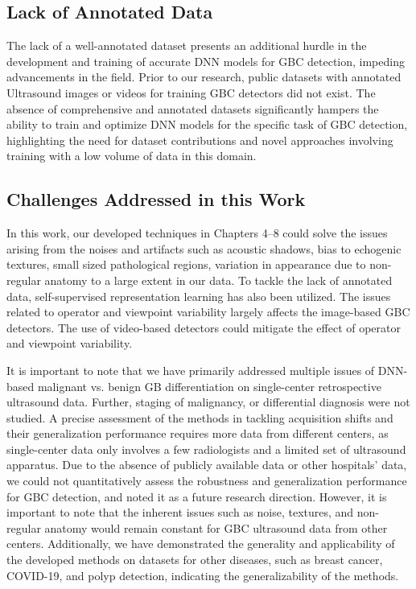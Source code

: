 \subsection{Lack of Annotated Data}
%
The lack of a well-annotated dataset presents an additional hurdle in the development and training of accurate DNN models for GBC detection, impeding advancements in the field. Prior to our research, public datasets with annotated Ultrasound images or videos for training GBC detectors did not exist. The absence of comprehensive and annotated datasets significantly hampers the ability to train and optimize DNN models for the specific task of GBC detection, highlighting the need for dataset contributions and novel approaches involving training with a low volume of data in this domain.

\subsection{Challenges Addressed in this Work}
%
In this work, our developed techniques in Chapters 4--8 could solve the issues arising from the noises and artifacts such as acoustic shadows, bias to echogenic textures, small sized pathological regions, variation in appearance due to non-regular anatomy to a large extent in our data. To tackle the lack of annotated data, self-supervised representation learning has also been utilized. The issues related to operator and viewpoint variability largely affects the image-based GBC detectors. The use of video-based detectors could mitigate the effect of operator and viewpoint variability.

It is important to note that we have primarily addressed multiple issues of DNN-based malignant vs. benign GB  differentiation on single-center retrospective ultrasound data. Further, staging of malignancy, or differential diagnosis were not studied. A precise assessment of the methods in tackling acquisition shifts and their generalization performance requires more data from different centers, as single-center data only involves a few radiologists and a limited set of ultrasound apparatus. Due to the absence of publicly available data or other hospitals' data, we could not quantitatively assess the robustness and generalization performance for GBC detection, and noted it as a future research direction. However, it is important to note that the inherent issues such as noise, textures, and non-regular anatomy would remain constant for GBC ultrasound data from other centers. Additionally, we have demonstrated the generality and applicability of the developed methods on datasets for other diseases, such as breast cancer, COVID-19, and polyp detection, indicating the generalizability of the methods.

